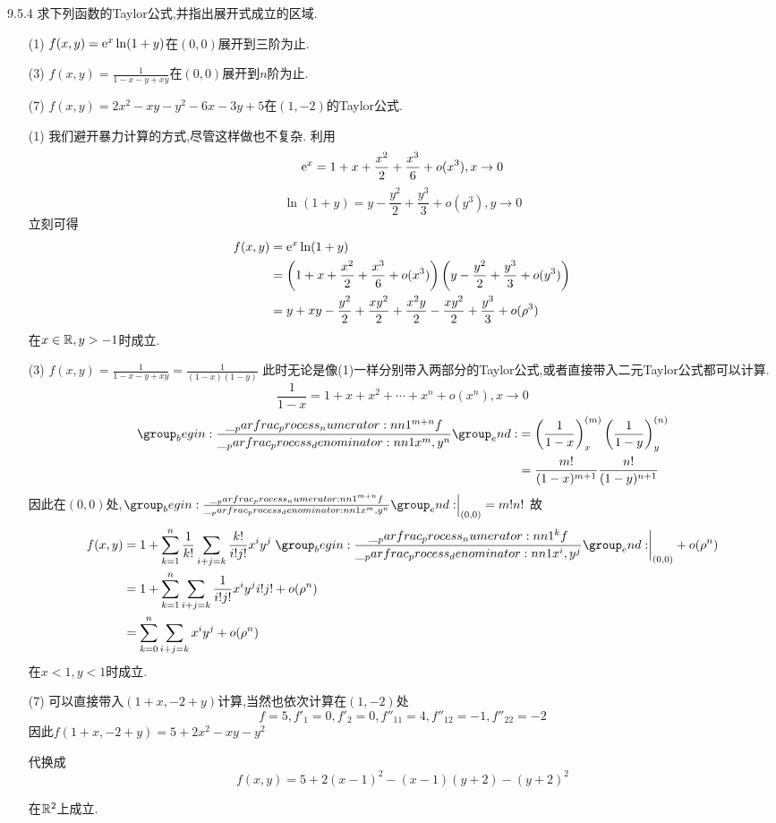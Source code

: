 \begin{exercise}{9.5.4}
    求下列函数的Taylor公式,并指出展开式成立的区域.
    \begin{enumerate}
        \item[(1)] $f(x,y)=\mathrm{e}^x\ln (1+y)$在$(0,0)$展开到三阶为止.
        \item[(3)] $f(x,y)=\frac{1}{1-x-y+xy}$在$(0,0)$展开到$n$阶为止.
        \item[(7)] $f(x,y)=2x^2-xy-y^2-6x-3y+5$在$(1,-2)$的Taylor公式.
    \end{enumerate}
\end{exercise}

\begin{solution}
    \begin{enumerate}
        \item[(1)] 我们避开暴力计算的方式,尽管这样做也不复杂.
        利用$$\mathrm{e}^x=1+x+\frac{x^2}{2}+\frac{x^3}{6}+o(x^3),x\to0$$
        $$\ln (1+y)=y-\frac{y^2}{2}+\frac{y^3}{3}+o(y^3),y\to0$$
        立刻可得\begin{align*}
            f(x,y)
            &=\mathrm{e}^x\ln (1+y)\\
            &=\left(1+x+\frac{x^2}{2}+\frac{x^3}{6}+o(x^3)\right)\left(y-\frac{y^2}{2}+\frac{y^3}{3}+o(y^3)\right)\\
            &=y+xy-\frac{y^2}{2}+\frac{xy^2}{2}+\frac{x^2y}{2}-\frac{xy^2}{2}+\frac{y^3}{3}+o(\rho^3)
        \end{align*}
        在$x\in\mathbb{R},y>-1$时成立.
        
        \item[(3)] $f(x,y)=\frac{1}{1-x-y+xy}=\frac{1}{(1-x)(1-y)}$
        此时无论是像(1)一样分别带入两部分的Taylor公式,或者直接带入二元Taylor公式都可以计算.
        $$\frac{1}{1-x}=1+x+x^2+\cdots+x^n+o(x^n),x\to0$$
        \begin{align*}
            \parfrac{^{m+n}f}{x^m,y^n}
            &=\left(\frac{1}{1-x}\right)^{(m)}_x\left(\frac{1}{1-y}\right)^{(n)}_y\\
            &=\frac{m!}{(1-x)^{m+1}}\frac{n!}{(1-y)^{n+1}}
        \end{align*}
        因此在$(0,0)$处,$\left.\parfrac{^{m+n}f}{x^m,y^n}\right|_{(0,0)}=m!n!$
        故\begin{align*}
            f(x,y)
            &=1+\sum_{k=1}^{n}\frac{1}{k!}\sum_{i+j=k}\frac{k!}{i!j!}x^iy^j\left.\parfrac{^k f}{x^i,y^j}\right|_{(0,0)}+o(\rho^n)\\
            &=1+\sum_{k=1}^{n}\sum_{i+j=k}\frac{1}{i!j!}x^iy^j i!j!+o(\rho^n)\\
            &=\sum_{k=0}^{n}\sum_{i+j=k}x^iy^j+o(\rho^n)
        \end{align*}
        在$x<1,y<1$时成立.

        \item[(7)]
        可以直接带入$(1+x,-2+y)$计算,当然也依次计算在$(1,-2)$处
        $$f=5,f'_{1}=0,f'_{2}=0,f''_{11}=4,f''_{12}=-1,f''_{22}=-2$$
        因此$f(1+x,-2+y)=5+2x^2-xy-y^2$
        
        代换成$$f(x,y)=5+2(x-1)^2-(x-1)(y+2)-(y+2)^2$$

        在$\mathbb{R}^2$上成立.
    \end{enumerate}
\end{solution}


